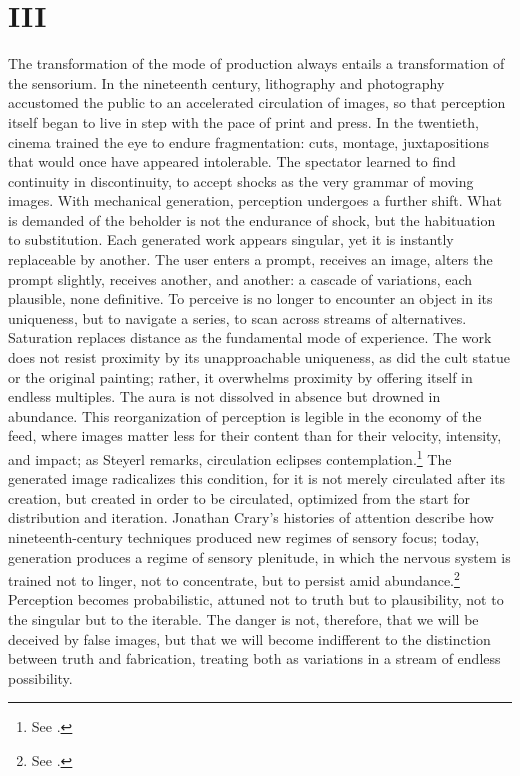 \documentclass[12pt]{article}
\begin{document}
\section*{III}

The transformation of the mode of production always entails a transformation of the sensorium. In the nineteenth century, lithography and photography accustomed the public to an accelerated circulation of images, so that perception itself began to live in step with the pace of print and press. In the twentieth, cinema trained the eye to endure fragmentation: cuts, montage, juxtapositions that would once have appeared intolerable. The spectator learned to find continuity in discontinuity, to accept shocks as the very grammar of moving images. With mechanical generation, perception undergoes a further shift. What is demanded of the beholder is not the endurance of shock, but the habituation to substitution. Each generated work appears singular, yet it is instantly replaceable by another. The user enters a prompt, receives an image, alters the prompt slightly, receives another, and another: a cascade of variations, each plausible, none definitive. To perceive is no longer to encounter an object in its uniqueness, but to navigate a series, to scan across streams of alternatives. Saturation replaces distance as the fundamental mode of experience. The work does not resist proximity by its unapproachable uniqueness, as did the cult statue or the original painting; rather, it overwhelms proximity by offering itself in endless multiples. The aura is not dissolved in absence but drowned in abundance. This reorganization of perception is legible in the economy of the feed, where images matter less for their content than for their velocity, intensity, and impact; as Steyerl remarks, circulation eclipses contemplation.\footnote{See \autocite{Steyerl2013}.} The generated image radicalizes this condition, for it is not merely circulated after its creation, but created in order to be circulated, optimized from the start for distribution and iteration. Jonathan Crary's histories of attention describe how nineteenth-century techniques produced new regimes of sensory focus; today, generation produces a regime of sensory plenitude, in which the nervous system is trained not to linger, not to concentrate, but to persist amid abundance.\footnote{See \autocite{Crary1999}.} Perception becomes probabilistic, attuned not to truth but to plausibility, not to the singular but to the iterable. The danger is not, therefore, that we will be deceived by false images, but that we will become indifferent to the distinction between truth and fabrication, treating both as variations in a stream of endless possibility.
\end{document}

